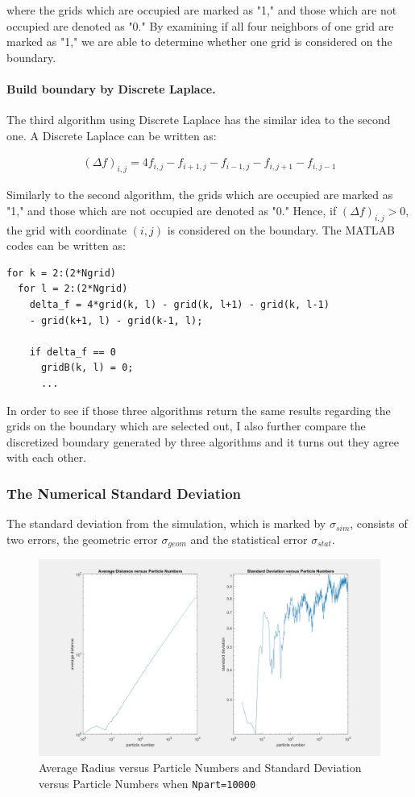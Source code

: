 \documentclass[letterpaper]{article}
\numberwithin{equation}{section} %
\numberwithin{figure}{section} %
\numberwithin{table}{section} %
\begin{document}
\noindent
where the grids which are occupied are marked as "1," and those which are not occupied are denoted as "0." By examining if all four neighbors of one grid are marked as "1," we are able to determine whether one grid is considered on the boundary.


\paragraph{Build boundary by Discrete Laplace.}
The third algorithm using Discrete Laplace has the similar idea to the second one. A Discrete Laplace can be written as:

\begin{align} 
(\Delta f)_{i,j} = 4f_{i,j}-f_{i+1,j}- f_{i-1,j}-f_{i,j+1}-f_{i,j-1}
\end{align}

\noindent
Similarly to the second algorithm, the grids which are occupied are marked as "1," and those which are not occupied are denoted as "0." Hence, if $(\Delta f)_{i,j}>0$, the grid with coordinate $(i,j)$ is considered on the boundary. The MATLAB codes can be written as:

\begin{lstlisting}
for k = 2:(2*Ngrid)
  for l = 2:(2*Ngrid)
    delta_f = 4*grid(k, l) - grid(k, l+1) - grid(k, l-1) 
    - grid(k+1, l) - grid(k-1, l);

    if delta_f == 0  
      gridB(k, l) = 0; 
      ...
\end{lstlisting}

In order to see if those three algorithms return the same results regarding the grids on the boundary which are selected out, I also further compare the discretized boundary generated by three algorithms and it turns out they agree with each other.

\subsubsection{The Numerical Standard Deviation}
The standard deviation from the simulation, which is marked by $\sigma_{sim}$, consists of two errors, the geometric error $\sigma_{geom}$ and the statistical error $\sigma_{stat}$. 

\begin{figure}[h]
	\centering
	\includegraphics[width=0.7\linewidth]{bdryRandSTD}
	\caption{Average Radius versus Particle Numbers and Standard Deviation versus Particle Numbers when \texttt{Npart=10000}}
	\label{fig:bdryRandSTD}
\end{figure}
\end{document}
